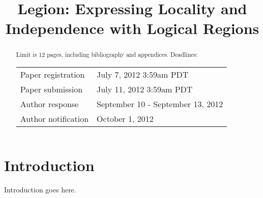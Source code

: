 \documentclass[9pt,nocopyrightspace,preprint]{sigplanconf}
\begin{document}
\title{Legion: Expressing Locality and Independence with Logical Regions}
\authorinfo{}{}{}
\maketitle

\begin{abstract}
Limit is 12 pages, including bibliography and appendices.
Deadlines: \\

\begin{tabular}{ll}
Paper registration & July 7, 2012 3:59am PDT \\
Paper submission & July 11, 2012 3:59am PDT \\
Author response & September 10 - September 13, 2012 \\
Author notification & October 1, 2012
\end{tabular}
\end{abstract}

\section{Introduction}
\label{sect:intro}
Introduction goes here.







{
\small

}
\end{document}
